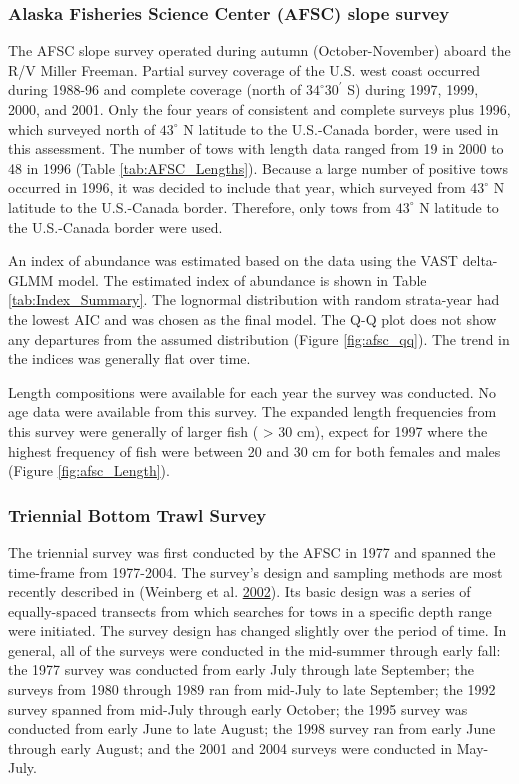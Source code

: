 \documentclass[12pt,]{article}
\begin{document}
\subsubsection{Alaska Fisheries Science Center (AFSC) slope
survey}\label{alaska-fisheries-science-center-afsc-slope-survey}

The AFSC slope survey operated during autumn (October-November) aboard
the R/V Miller Freeman. Partial survey coverage of the U.S. west coast
occurred during 1988-96 and complete coverage (north of
\(34^\circ 30^\prime\) S) during 1997, 1999, 2000, and 2001. Only the
four years of consistent and complete surveys plus 1996, which surveyed
north of \(43^\circ\) N latitude to the U.S.-Canada border, were used in
this assessment. The number of tows with length data ranged from 19 in
2000 to 48 in 1996 (Table \ref{tab:AFSC_Lengths}). Because a large
number of positive tows occurred in 1996, it was decided to include that
year, which surveyed from \(43^\circ\) N latitude to the U.S.-Canada
border. Therefore, only tows from \(43^\circ\) N latitude to the
U.S.-Canada border were used.

An index of abundance was estimated based on the data using the VAST
delta-GLMM model. The estimated index of abundance is shown in Table
\ref{tab:Index_Summary}. The lognormal distribution with random
strata-year had the lowest AIC and was chosen as the final model. The
Q-Q plot does not show any departures from the assumed distribution
(Figure \ref{fig:afsc_qq}). The trend in the indices was generally flat
over time.

Length compositions were available for each year the survey was
conducted. No age data were available from this survey. The expanded
length frequencies from this survey were generally of larger fish (
\textgreater{} 30 cm), expect for 1997 where the highest frequency of
fish were between 20 and 30 cm for both females and males (Figure
\ref{fig:afsc_Length}).

\subsubsection{Triennial Bottom Trawl
Survey}\label{triennial-bottom-trawl-survey}

The triennial survey was first conducted by the AFSC in 1977 and spanned
the time-frame from 1977-2004. The survey's design and sampling methods
are most recently described in (Weinberg et al.
\protect\hyperlink{ref-weinberg_estimation_2002}{2002}). Its basic
design was a series of equally-spaced transects from which searches for
tows in a specific depth range were initiated. The survey design has
changed slightly over the period of time. In general, all of the surveys
were conducted in the mid-summer through early fall: the 1977 survey was
conducted from early July through late September; the surveys from 1980
through 1989 ran from mid-July to late September; the 1992 survey
spanned from mid-July through early October; the 1995 survey was
conducted from early June to late August; the 1998 survey ran from early
June through early August; and the 2001 and 2004 surveys were conducted
in May-July.
\end{document}
